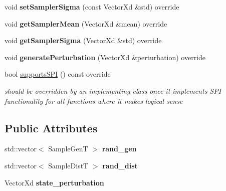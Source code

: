 \begin{DoxyCompactItemize}
\item 
\hypertarget{classSSDBase_a6909d2965fe75734a997e91967b96f31}{void {\bfseries set\-Sampler\-Sigma} (const Vector\-Xd \&std) override}\label{classSSDBase_a6909d2965fe75734a997e91967b96f31}

\item 
\hypertarget{classSSDBase_ae827f14ab8a474668c52b02090038da8}{void {\bfseries get\-Sampler\-Mean} (Vector\-Xd \&mean) override}\label{classSSDBase_ae827f14ab8a474668c52b02090038da8}

\item 
\hypertarget{classSSDBase_a20ee7e6c40b486a99d2c0977a72fb46c}{void {\bfseries get\-Sampler\-Sigma} (Vector\-Xd \&std) override}\label{classSSDBase_a20ee7e6c40b486a99d2c0977a72fb46c}

\item 
\hypertarget{classSSDBase_a8b25691bc14ccc80502fcad41b76e35f}{void {\bfseries generate\-Perturbation} (Vector\-Xd \&perturbation) override}\label{classSSDBase_a8b25691bc14ccc80502fcad41b76e35f}

\item 
\hypertarget{classSSDBase_ac020668a264146f49d8aaed6235da77e}{bool \hyperlink{classSSDBase_ac020668a264146f49d8aaed6235da77e}{supports\-S\-P\-I} () const override}\label{classSSDBase_ac020668a264146f49d8aaed6235da77e}

\begin{DoxyCompactList}\small\item\em should be overridden by an implementing class once it implements S\-P\-I functionality for all functions where it makes logical sense \end{DoxyCompactList}\end{DoxyCompactItemize}
\subsection*{Public Attributes}
\begin{DoxyCompactItemize}
\item 
\hypertarget{classSSDBase_a64307dc8d2440062f653da75ba8a0511}{std\-::vector$<$ Sample\-Gen\-T $>$ {\bfseries rand\-\_\-gen}}\label{classSSDBase_a64307dc8d2440062f653da75ba8a0511}

\item 
\hypertarget{classSSDBase_ad4baf743da2a114647a250b61b1f856c}{std\-::vector$<$ Sample\-Dist\-T $>$ {\bfseries rand\-\_\-dist}}\label{classSSDBase_ad4baf743da2a114647a250b61b1f856c}

\item 
\hypertarget{classSSDBase_acd1296253d948dfc00b8c9ab2f19dca9}{Vector\-Xd {\bfseries state\-\_\-perturbation}}\label{classSSDBase_acd1296253d948dfc00b8c9ab2f19dca9}

\end{DoxyCompactItemize}
